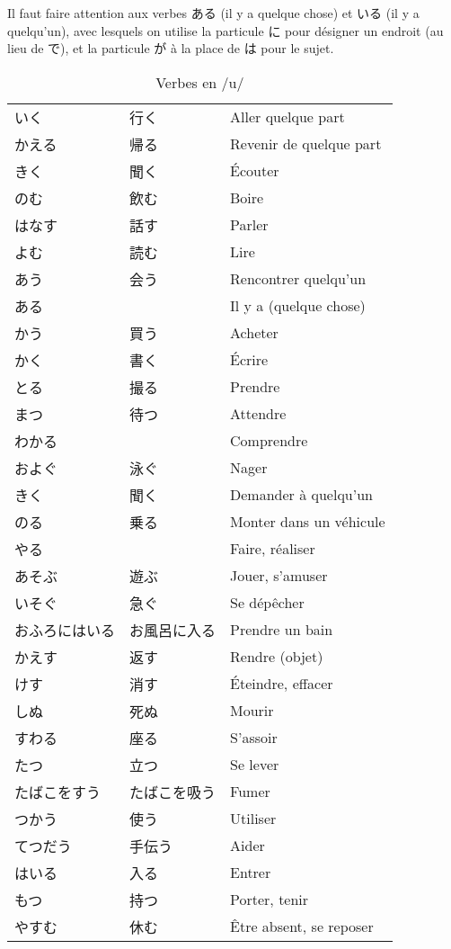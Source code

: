 \documentclass[a4paper,10pt,french,openany]{memoir}
\begin{document}
Il faut faire attention aux verbes ある (il y a quelque chose) et いる (il y a quelqu'un), avec lesquels on utilise la particule に pour désigner un endroit (au lieu de で), et la particule が à la place de は pour le sujet.

\begin{table}[h]
 \centering
 \begin{tabular}{lll}
  いく & 行く & Aller quelque part \\
  かえる & 帰る & Revenir de quelque part \\
  きく & 聞く & Écouter \\
  のむ & 飲む & Boire \\
  はなす & 話す & Parler \\
  よむ & 読む & Lire \\
  あう & 会う & Rencontrer quelqu'un \\
  ある & & Il y a (quelque chose) \\
  かう & 買う & Acheter \\
  かく & 書く & Écrire \\
  とる & 撮る & Prendre \\
  まつ & 待つ & Attendre \\
  わかる & & Comprendre \\
  およぐ & 泳ぐ & Nager \\
  きく & 聞く & Demander à quelqu'un \\
  のる & 乗る & Monter dans un véhicule \\
  やる & & Faire, réaliser \\
  あそぶ & 遊ぶ & Jouer, s'amuser \\
  いそぐ & 急ぐ & Se dépêcher \\
  おふろにはいる & お風呂に入る & Prendre un bain \\
  かえす & 返す & Rendre (objet) \\
  けす & 消す & Éteindre, effacer \\
  しぬ & 死ぬ & Mourir \\
  すわる & 座る & S'assoir \\
  たつ & 立つ & Se lever \\
  たばこをすう & たばこを吸う & Fumer \\
  つかう & 使う & Utiliser \\
  てつだう & 手伝う & Aider \\
  はいる & 入る & Entrer \\
  もつ & 持つ & Porter, tenir \\
  やすむ & 休む & Être absent, se reposer \\
 \end{tabular}
 \caption{Verbes en /u/}
 \label{tab:verbes-u}
\end{table}
\end{document}
